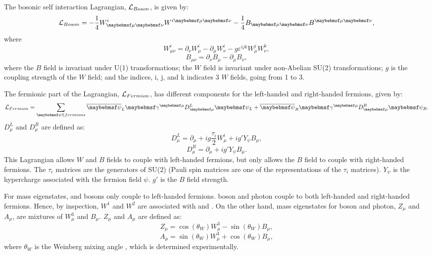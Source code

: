 The bosonic self interaction Lagrangian, $\operatorname{\mathcal{L}}_{Boson}$, is given by:
\begin{equation}
\Lagr_{Boson} = - \frac{1}{4} W^i_{\mu\nu} W^{i\mu\nu} - \frac{1}{4}B_{\mu\nu} B^{\mu\nu},
\end{equation}
where
\begin{equation}
W^i_{\mu\nu} = \partial_{\nu}W^i_{\mu} - \partial_{\mu}W^i_{\nu} - g\varepsilon^{ijk}W^j_{\mu}W^k_\nu ,
\end{equation}
\begin{equation}
B_{\mu\nu} = \partial_{\nu}B_{\mu} - \partial_{\mu}B_{\nu},
\end{equation}
where the $B$ field  is invariant under U(1) transformations; the $W$ field is invariant under non-Abelian SU(2) transformations; $g$ is the coupling strength of the $W$ field; and the indices, i, j, and k indicates 3 $W$ fields, going from 1 to 3.

The fermionic part of the Lagrangian,   $\operatorname{\mathcal{L}}_{Fermion}$, has different components for the left-handed and right-handed fermions, given by:
\begin{equation}
\Lagr_{Fermion} = \sum_{\psi\in{fermions}} {\overline{\psi}}_L \gamma^{\mu}D^L_{\mu} \psi_L +  \overline{\psi}_R \gamma^{\mu}D^R_{\mu} \psi_R .
\end{equation}
$D^L_{\mu}$ and $D^R_{\mu}$ are defined as:
\begin{equation}
D^L_{\mu} = \partial_{\mu} + ig\frac{\tau_i}{2}W^i_{\mu} + ig'Y_{\psi}B_{\mu} ,
\end{equation}
\begin{equation}
D^R_{\mu} = \partial_{\mu}  + ig'Y_{\psi}B_{\mu} .
\end{equation}
This Lagrangian allows $W$ and $B$ fields to couple with left-handed fermions, but only allows the $B$ field to couple with right-handed fermions. The $\tau_i$ matrices are the generators of SU(2) (Pauli spin matrices are one of the representations of the $\tau_i$ matrices). $Y_{\psi}$ is the hypercharge associated with the fermion field $\psi$. $g'$ is the $B$ field strength.

For mass eigenstates, \PWp and \PWm bosons only couple to left-handed fermions. \PZ boson and photon couple to both left-handed and right-handed fermions. Hence, by inspection, $W^1$ and $W^2$ are associated with \PWp and \PWm. On the other hand, mass eigenstates for \PZ boson and photon, $Z_{\mu}$ and $A_{\mu}$, are mixtures of $W^3_{\mu}$ and $B_{\mu}$. $Z_{\mu}$ and $A_{\mu}$ are defined as:
\begin{equation}
Z_{\mu} = \cos\left(\theta_W\right)W^3_{\mu} - \sin\left(\theta_W\right)B_{\mu},
\end{equation}
\begin{equation}
A_{\mu} = \sin\left(\theta_W\right)W^3_{\mu} + \cos\left(\theta_W\right)B_{\mu},
\end{equation}
where $\theta_W$ is the Weinberg mixing angle \cite{Weinberg:1967tq}, which is determined experimentally. 

